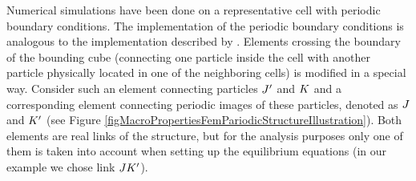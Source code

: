 Numerical simulations have been done on a representative cell with periodic boundary conditions.
The implementation of the periodic boundary conditions is analogous to the implementation described by \cite{GrasslJirasek2010a}.
Elements crossing the boundary of the bounding cube (connecting one particle inside the cell with another particle physically located in one of the neighboring cells) is modified in a special way.
Consider such an element connecting particles $J'$ and $K$ and a corresponding element connecting periodic images of these particles, denoted as $J$ and $K'$ (see Figure \ref{figMacroPropertiesFemPariodicStructureIllustration}).
Both elements are real links of the structure, but for the analysis purposes only one of them is taken into account when setting up the equilibrium equations (in our example we chose link $JK'$).

